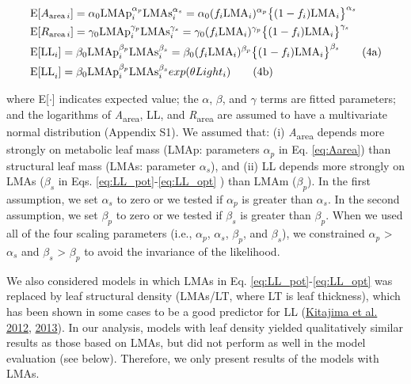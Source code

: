 \documentclass[
  12pt,
  a4paper,
,tablecaptionabove
]{scrartcl}
\begin{document}
\begin{align}
& \mathrm{E}[A_{\mathrm{area} \, i}]
= \alpha_0\mathrm{LMAp}_{i}^{\alpha_p}\mathrm{LMAs}_i^{\alpha_s}  =  \alpha_0 (f_i \mathrm{LMA}_{i})^{\alpha_p} \bigl\{(1-f_i) \mathrm{LMA}_{i}\bigr\}^{\alpha_s} \label{eq:Aarea} \\
& \mathrm{E}[R_{\mathrm{area} \, i}]
= \gamma_0\mathrm{LMAp}_{i}^{\gamma_p} \mathrm{LMAs}_{i}^{\gamma_s}
= \gamma_0 (f_i \mathrm{LMA}_{i})^{\gamma_p} \bigl\{(1-f_i)\mathrm{LMA}_{i}\bigr\}^{\gamma_s} \label{eq:Rarea} \\
& \mathrm{E}[\mathrm{LL}_i] = \beta_0\mathrm{LMAp}_{i}^{\beta_p} \mathrm{LMAs}_{i}^{\beta_s}  = \beta_0 (f_i \mathrm{LMA}_{i})^{\beta_p} \bigl\{(1-f_i) \mathrm{LMA}_{i}\bigr\}^{\beta_s} \label{eq:LL_pot} \tag{4a}  \\
& \mathrm{E[LL}_i] = \beta_0\mathrm{LMAp}_{i}^{\beta_p} \mathrm{LMAs}_{i}^{\beta_s} exp(\theta Light_i)  \stepcounter{equation} \label{eq:LL_opt} \tag{4b}
\end{align}

where E{[}\(\cdot\){]} indicates expected value; the \(\alpha\),
\(\beta\), and \(\gamma\) terms are fitted parameters; and the
logarithms of \emph{A}\textsubscript{area}, LL, and
\emph{R}\textsubscript{area} are assumed to have a multivariate normal
distribution (Appendix S1). We assumed that: (i)
\emph{A}\textsubscript{area} depends more strongly on metabolic leaf
mass (LMAp: parameters \(\alpha_p\) in Eq. \ref{eq:Aarea}) than
structural leaf mass (LMAs: parameter \(\alpha_s\)), and (ii) LL depends
more strongly on LMAs (\(\beta_s\) in Eqs.
\ref{eq:LL_pot}-\ref{eq:LL_opt} ) than LMAm (\(\beta_p\)). In the first
assumption, we set \(\alpha_s\) to zero or we tested if \(\alpha_p\) is
greater than \(\alpha_s\). In the second assumption, we set \(\beta_p\)
to zero or we tested if \(\beta_s\) is greater than \(\beta_p\). When we
used all of the four scaling parameters (i.e., \(\alpha_p\),
\(\alpha_s\), \(\beta_p\), and \(\beta_s\)), we constrained \(\alpha_p\)
\textgreater{} \(\alpha_s\) and \(\beta_s\) \textgreater{} \(\beta_p\)
to avoid the invariance of the likelihood.

We also considered models in which LMAs in Eq.
\ref{eq:LL_pot}-\ref{eq:LL_opt} was replaced by leaf structural density
(LMAs/LT, where LT is leaf thickness), which has been shown in some
cases to be a good predictor for LL
(\protect\hyperlink{ref-Kitajima2012}{Kitajima et al. 2012},
\protect\hyperlink{ref-Kitajima2013}{2013}). In our analysis, models
with leaf density yielded qualitatively similar results as those based
on LMAs, but did not perform as well in the model evaluation (see
below). Therefore, we only present results of the models with LMAs.
\end{document}
